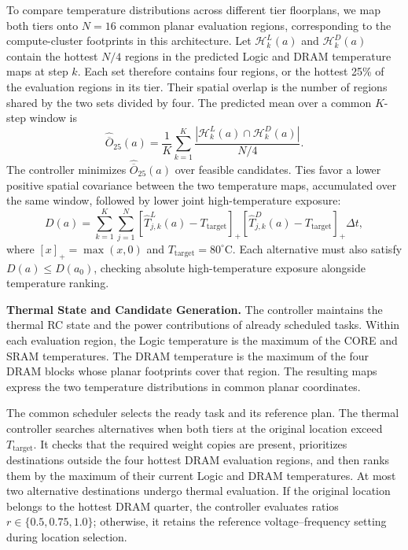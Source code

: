 \documentclass[conference,10pt]{IEEEtran}
\begin{document}
To compare temperature distributions across different tier floorplans,
we map both tiers onto $N=16$ common planar evaluation regions,
corresponding to the compute-cluster footprints in this architecture.
Let
$\mathcal{H}^{L}_k(a)$ and $\mathcal{H}^{D}_k(a)$ contain the hottest
$N/4$ regions in the predicted Logic and DRAM temperature maps at
step $k$. Each set therefore contains four regions, or the hottest
25\% of the evaluation regions in its tier. Their spatial overlap is
the number of regions shared by the two sets divided by four.
The predicted mean over a common $K$-step window is
\begin{equation}
  \widehat{\overline{O}}_{25}(a)=
  \frac{1}{K}\sum_{k=1}^{K}
  \frac{|\mathcal{H}^{L}_k(a)\cap\mathcal{H}^{D}_k(a)|}{N/4}.
  \label{eq:thermal-overlap-objective}
\end{equation}
The controller minimizes $\widehat{\overline{O}}_{25}(a)$ over feasible
candidates. Ties favor a lower positive spatial covariance between the
two temperature maps, accumulated over the same window, followed by
lower joint high-temperature exposure:
\begin{equation}
  D(a)=\sum_{k=1}^{K}\sum_{j=1}^{N}
  [\widehat{T}^{L}_{j,k}(a)-T_{\mathrm{target}}]_+
  [\widehat{T}^{D}_{j,k}(a)-T_{\mathrm{target}}]_+\Delta t,
  \label{eq:thermal-joint-exposure}
\end{equation}
where $[x]_+=\max(x,0)$ and $T_{\mathrm{target}}=80^\circ$C.
Each alternative must also satisfy $D(a)\leq D(a_0)$, checking absolute
high-temperature exposure alongside temperature ranking.

\noindent\textbf{Thermal State and Candidate Generation.}
The controller maintains the thermal RC state and the power
contributions of already scheduled tasks. Within each evaluation
region, the Logic temperature is the maximum of the CORE and SRAM
temperatures. The DRAM temperature is the maximum of the four DRAM
blocks whose planar footprints cover that region. The resulting maps
express the two temperature distributions in common planar coordinates.

The common scheduler selects the ready task and its reference plan.
The thermal controller searches alternatives when both tiers at the
original location exceed $T_{\mathrm{target}}$. It checks that the required
weight copies are present, prioritizes destinations outside the four
hottest DRAM evaluation regions, and then ranks them by the maximum
of their current Logic and DRAM temperatures.
At most two alternative destinations undergo thermal evaluation.
If the original location belongs to the hottest DRAM quarter, the
controller evaluates ratios $r\in\{0.5,0.75,1.0\}$; otherwise, it
retains the reference voltage--frequency setting during location selection.
\end{document}
